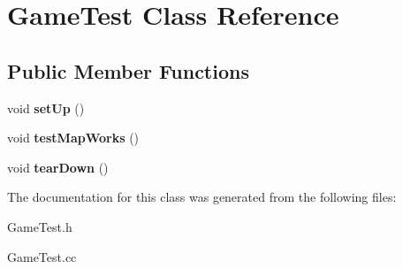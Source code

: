 \hypertarget{classGameTest}{
\section{GameTest Class Reference}
\label{classGameTest}
}
\subsection*{Public Member Functions}
\begin{DoxyCompactItemize}
\item 
\hypertarget{classGameTest_ae59a786901a5d5d6eac0b13e4c38f24d}{
void {\bfseries setUp} ()}
\label{classGameTest_ae59a786901a5d5d6eac0b13e4c38f24d}

\item 
\hypertarget{classGameTest_a786ebde5623666c92774ab7447cdf48e}{
void {\bfseries testMapWorks} ()}
\label{classGameTest_a786ebde5623666c92774ab7447cdf48e}

\item 
\hypertarget{classGameTest_a75671190575a912823391e78b111a807}{
void {\bfseries tearDown} ()}
\label{classGameTest_a75671190575a912823391e78b111a807}

\end{DoxyCompactItemize}


The documentation for this class was generated from the following files:\begin{DoxyCompactItemize}
\item 
GameTest.h\item 
GameTest.cc\end{DoxyCompactItemize}
